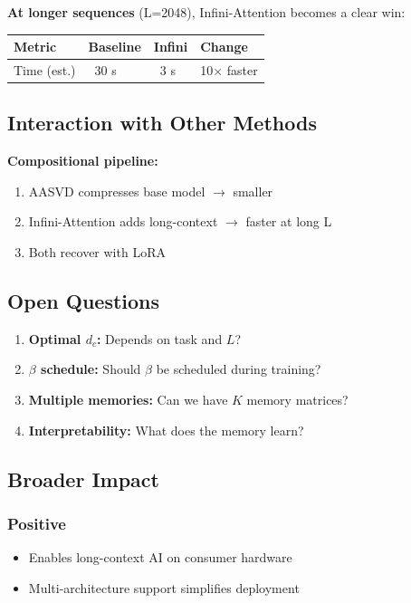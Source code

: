 \textbf{At longer sequences} (L=2048), Infini-Attention becomes a clear win:

\begin{table}[H]
\centering
\small
\begin{tabular}{llll}
\toprule
\textbf{Metric} & \textbf{Baseline} & \textbf{Infini} & \textbf{Change} \\
\midrule
Time (est.) & ~30 s & ~3 s & 10$\times$ faster \\
\bottomrule
\end{tabular}
\end{table}

\subsection{Interaction with Other Methods}

\textbf{Compositional pipeline:}

\begin{enumerate}
\item AASVD compresses base model $\to$ smaller
\item Infini-Attention adds long-context $\to$ faster at long L
\item Both recover with LoRA

\end{enumerate}
\subsection{Open Questions}

\begin{enumerate}
\item \textbf{Optimal $d_c$:} Depends on task and $L$?
\item \textbf{$\beta$ schedule:} Should $\beta$ be scheduled during training?
\item \textbf{Multiple memories:} Can we have $K$ memory matrices?
\item \textbf{Interpretability:} What does the memory learn?

\end{enumerate}
\subsection{Broader Impact}

\subsubsection{Positive}
\begin{itemize}
\item Enables long-context AI on consumer hardware
\item Multi-architecture support simplifies deployment

\end{itemize}
